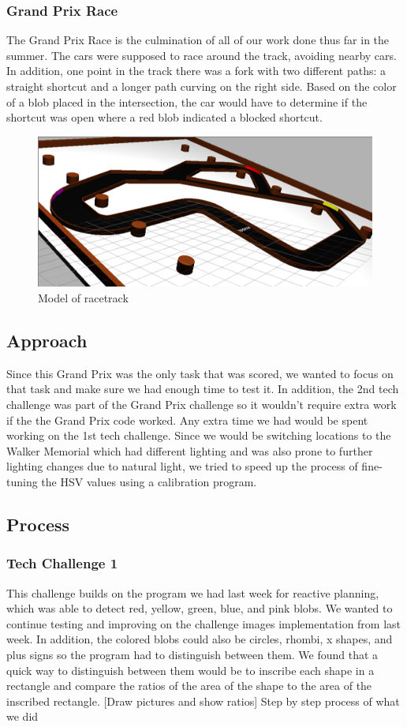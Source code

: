 \documentclass[journal, a4paper]{IEEEtran}
\begin{document}
\subsubsection{Grand Prix Race}
The Grand Prix Race is the culmination of all of our work done thus far in the summer. The cars were supposed to race around the track, avoiding nearby cars. In addition, one point in the track there was a fork with two different paths: a straight shortcut and a longer path curving on the right side. Based on the color of a blob placed in the intersection, the car would have to determine if the shortcut was open where a red blob indicated a blocked shortcut. 
\begin{figure}[H]
\includegraphics[scale=.20]{gazebo_track.png}
\caption{Model of racetrack \cite{gazebo_pic}} 
\end{figure}
\subsection{Approach}
Since this Grand Prix was the only task that was scored, we wanted to focus on that task and make sure we had enough time to test it. In addition, the 2nd tech challenge was part of the Grand Prix challenge so it wouldn't require extra work if the the Grand Prix code worked. Any extra time we had would be spent working on the 1st tech challenge. Since we would be switching locations to the Walker Memorial which had different lighting and was also prone to further lighting changes due to natural light, we tried to speed up the process of fine-tuning the HSV values using a calibration program.
\subsection{Process}
\subsubsection{Tech Challenge 1}
This challenge builds on the program we had last week for reactive planning, which was able to detect red, yellow, green, blue, and pink blobs. We wanted to continue testing and improving on the challenge images implementation from last week. In addition, the colored blobs could also be circles, rhombi, x shapes, and plus signs so the program had to distinguish between them. We found that a quick way to distinguish between them would be to inscribe each shape in a rectangle and compare the ratios of the area of the shape to the area of the inscribed rectangle. [Draw pictures and show ratios] 
Step by step process of what we did
\end{document}
